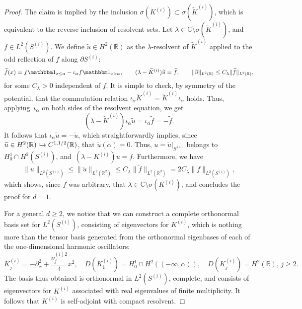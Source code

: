 \documentclass[10pt]{article}
\newcommand{\R}{\mathbb{R}}
\newcommand{\1}{\mathbbm 1}
\begin{document}
\begin{proof}
        The claim is implied by the inclusion $\sigma(K^{(i)}) \subset \sigma(\widetilde K^{(i)})$, which is equivalent to the reverse inclusion of resolvent sets.
        Let $\lambda\in  \mathbb C \setminus \sigma(\widetilde K^{(i)})$, and $f\in L^{2}(S^{(i)})$. We define $\widetilde u \in H^2(\R)$ as the $\lambda$-resolvent of $\widetilde K^{(i)}$ applied to the odd reflection of $f$ along $\partial S^{(i)}$:
        $$\widetilde f(x) = f{\mathbbm 1}_{x\leq \alpha} - \iota_\alpha f{\mathbbm 1}_{x>\alpha},\qquad (\lambda-\widetilde K^{(i)}) \widetilde u = \widetilde f,\qquad \|\widetilde u\|_{L^2(\R)}\leq C_\lambda \|\widetilde f\|_{L^2(\R)},$$
        for some $C_\lambda>0$ independent of $f$.
        It is simple to check, by symmetry of the potential, that the commutation relation $\iota_\alpha\widetilde K^{(i)} = \widetilde K^{(i)}\iota_\alpha$ holds.
        Thus, applying~$\iota_\alpha$ on both sides of the resolvent equation, we get
        $$(\lambda-\widetilde K^{(i)})\iota_\alpha\widetilde u = \iota_\alpha \widetilde f = -\widetilde f.$$
        It follows that $\iota_\alpha \widetilde u = -\widetilde u$, which straightforwardly implies, since $\widetilde u \in H^2(\R)\xhookrightarrow{} C^{1,1/2}(\R)$, that $\widetilde u(\alpha)=0$.
        Thus, $u = \widetilde u|_{S^{(i)}}$ belongs to $H_0^1\cap H^2(S^{(i)})$, and~$(\lambda-K^{(i)})u=f$.
        Furthermore, we have 
        $$\|u\|_{L^2(S^{(i)})} \leq \|\widetilde u\|_{L^2(\R^d)}\leq C_\lambda\|\widetilde f\|_{L^2(\R^d)} = 2 C_\lambda\|f\|_{L^2(S^{(i)})},$$
        which shows, since $f$ was arbitrary, that $\lambda\in \mathbb C \setminus \sigma(K^{(i)})$, and concludes the proof for $d=1$.

        For a general $d\geq 2$, we notice that we can construct a complete orthonormal basis set for $L^2(S^{(i)})$, consisting of eigenvectors for $K^{(i)}$, which is nothing more than the tensor basis generated from the orthonormal eigenbases of each of the one-dimensional harmonic oscillators:
        \[K_j^{(i)} = -\partial_x^2 + \frac{\nu_j^{(i)2}}{4}x^2,\quad D(K_1^{(i)}) = H_0^1\cap H^2((-\infty,\alpha)),\quad D(K_j^{(i)}) = H^2(\R),\, j\geq 2.\]
        The basis thus obtained is orthonormal in $L^2(S^{(i)})$, complete, and consists of eigenvectors for $K^{(i)}$ associated with real eigenvalues of finite multiplicity. It follows that $K^{(i)}$ is self-adjoint with compact resolvent.
    \end{proof}
\end{document}

